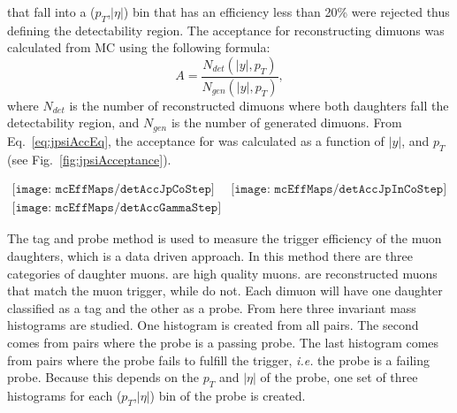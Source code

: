         that fall into a ($p_{T}$,$|\eta|$) bin that has an efficiency less 
        than 20\% were rejected thus defining the detectability region.
      The acceptance for reconstructing dimuons was calculated from MC
        using the following formula:
      \begin{equation}
        A=\frac{N_{det}(|y|,p_{T})}{N_{gen}(|y|,p_{T})},
        \label{eq:jpsiAccEq}
      \end{equation}
        where $N_{det}$ is the number of reconstructed dimuons where both 
        daughters fall \DIFdelbegin {}\DIFdelend \DIFaddbegin {}\DIFaddend the detectability region, and $N_{gen}$ is the
        number of generated dimuons. 
      From Eq.~\ref{eq:jpsiAccEq}, the acceptance for \DIFdelbegin {}\DIFdelend \DIFaddbegin {}\DIFaddend was calculated
        as a function of $|y|$, and $p_{T}$ (see Fig.~\ref{fig:jpsiAcceptance}).
        \begin{figure*}[!Hhtb]
          \centering
          $ \begin{array}{cc}
            \texttt{[image: mcEffMaps/detAccJpCoStep]} &
            \texttt{[image: mcEffMaps/detAccJpInCoStep]} \\
            \texttt{[image: mcEffMaps/detAccGammaStep]}
          \end{array} $
          \caption{Dimuon acceptance from coherent J/$\psi$ (top left), incoherent 
            J$\psi$ (top right), and photon-photon interactions (lower).}
          \label{fig:jpsiAcceptance}
        \end{figure*}

      The tag and probe method is used to measure the trigger efficiency of 
        the muon daughters, which is a data driven approach. 
      In this method there are three categories of daughter muons. 
      \DIFdelbegin {}\DIFdelend \DIFaddbegin \textit{} \DIFaddend are high quality muons.
      \DIFdelbegin {}\DIFdelend \DIFaddbegin \textit{} \DIFaddend are reconstructed muons that match the muon trigger, 
        while \DIFdelbegin {}\DIFdelend \DIFaddbegin \textit{} \DIFaddend do not. 
      Each dimuon will have one daughter classified as a tag and the other
        as a probe.
      From here three invariant mass histograms are studied. 
      One histogram is created from all pairs. 
      The second comes from pairs where the probe is a passing probe.  
      The last histogram comes from pairs where the probe fails to fulfill
        the trigger, \textit{i.e.} the probe is a failing probe. 
      Because this depends on the $p_{T}$ and $|\eta|$ of the probe, one set 
        of three histograms for each ($p_{T}$,$|\eta|$) bin of the probe is 
        created.

